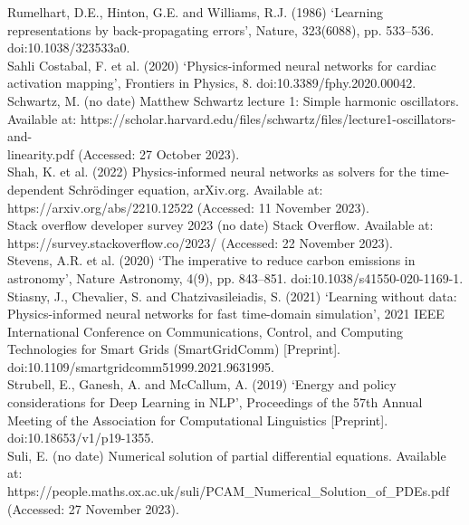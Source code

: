 \documentclass[12pt, openany]{book}
\begin{document}
Rumelhart, D.E., Hinton, G.E. and Williams, R.J. (1986) ‘Learning representations by back-propagating errors’, Nature, 323(6088), pp. 533–536. doi:10.1038/323533a0. \\

Sahli Costabal, F. et al. (2020) ‘Physics-informed neural networks for cardiac activation mapping’, Frontiers in Physics, 8. doi:10.3389/fphy.2020.00042. \\

Schwartz, M. (no date) Matthew Schwartz lecture 1: Simple harmonic oscillators. Available at: https://scholar.harvard.edu/files/schwartz/files/lecture1-oscillators-and-\\ linearity.pdf (Accessed: 27 October 2023). \\

Shah, K. et al. (2022) Physics-informed neural networks as solvers for the time-dependent Schrödinger equation, arXiv.org. Available at: https://arxiv.org/abs/2210.12522 (Accessed: 11 November 2023). \\

Stack overflow developer survey 2023 (no date) Stack Overflow. Available at: \\ https://survey.stackoverflow.co/2023/ (Accessed: 22 November 2023). \\

Stevens, A.R. et al. (2020) ‘The imperative to reduce carbon emissions in astronomy’, Nature Astronomy, 4(9), pp. 843–851. doi:10.1038/s41550-020-1169-1. \\

Stiasny, J., Chevalier, S. and Chatzivasileiadis, S. (2021) ‘Learning without data: Physics-informed neural networks for fast time-domain simulation’, 2021 IEEE International Conference on Communications, Control, and Computing Technologies for Smart Grids (SmartGridComm) [Preprint]. doi:10.1109/smartgridcomm51999.2021.9631995. \\

Strubell, E., Ganesh, A. and McCallum, A. (2019) ‘Energy and policy considerations for Deep Learning in NLP’, Proceedings of the 57th Annual Meeting of the Association for Computational Linguistics [Preprint]. doi:10.18653/v1/p19-1355. \\

Suli, E. (no date) Numerical solution of partial diﬀerential equations. Available at: https://people.maths.ox.ac.uk/suli/PCAM{\_}Numerical{\_}Solution{\_}of{\_}PDEs.pdf (Accessed: 27 November 2023). \\
\end{document}
